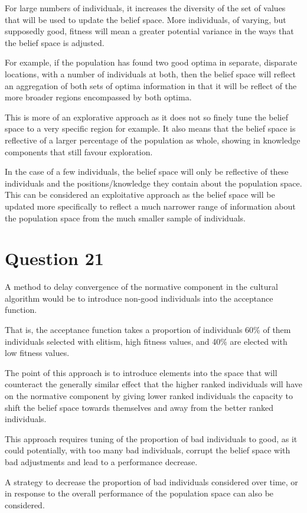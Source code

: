 \documentclass[12pt]{article}
\begin{document}
	For large numbers of individuals, it increases the diversity of the set of values that will be used to update the belief space. More individuals, of varying, but supposedly good, fitness will mean a greater potential variance in the ways that the belief space is adjusted.

	For example, if the population has found two good optima in separate, disparate locations, with a number of individuals at both, then the belief space will reflect an aggregation of both sets of optima information in that it will be reflect of the more broader regions encompassed by both optima.

	This is more of an explorative approach as it does not so finely tune the belief space to a very specific region for example. It also means that the belief space is reflective of a larger percentage of the population as whole, showing in knowledge components that still favour exploration.

	In the case of a few individuals, the belief space will only be reflective of these individuals and the positions/knowledge they contain about the population space. This can be considered an exploitative approach as the belief space will be updated more specifically to reflect a much narrower range of information about the population space from the much smaller sample of individuals.
\section{Question 21}
A method to delay convergence of the normative component in the cultural algorithm would be to introduce non-good individuals into the acceptance function.

That is, the acceptance function takes a proportion of individuals 60\% of them individuals selected with elitism, high fitness values, and 40\% are elected with low fitness values.

The point of this approach is to introduce elements into the space that will counteract the generally similar effect that the higher ranked individuals will have on the normative component by giving lower ranked individuals the capacity to shift the belief space towards themselves and away from the better ranked individuals.

This approach requires tuning of the proportion of bad individuals to good, as it could potentially, with too many bad individuals, corrupt the belief space with bad adjustments and lead to a performance decrease.

A strategy to decrease the proportion of bad individuals considered over time, or in response to the overall performance of the population space can also be considered.
\end{document}
